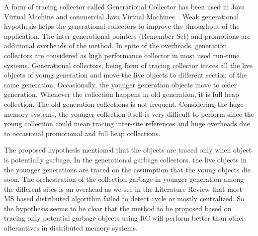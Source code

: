 A form of tracing collector called Generational Collector has been used in Java Virtual Machine and commercial Java Virtual Machines~\cite{Vengerov,Tene}. Weak generational hypothesis helps the generational collectors to improve the throughput of the application. The inter-generational pointers (Remember Set) and promotions are  additional overheads of the method. In spite of the overheads, generation collectors are considered as high performance collector in most used run-time systems. Generational collectors, being form of tracing collector traces all the live objects of young generation and move the live objects to different section of the same generation. Occasionally, the younger generation objects move to older generation. Whenever the collection happens  in old generation, it is full heap collection. The old generation collections is not frequent. Considering the huge memory systems, the younger collection itself is very difficult to perform since the young collection could mean tracing inter-site references and huge overheads due to occasional promotional and full heap collections. 

The proposed hypothesis mentioned that the objects are traced only when object is potentially garbage.  In the generational garbage collectors, the live objects in the younger generations are traced on the assumption that the young objects die soon. The orchestration of the collection garbage in younger generation among the different sites is an overhead as we see in the Literature Review that most MS based distributed algorithm failed to detect cycle or mostly centralized. So the hypothesis seems to be clear that the method to be proposed based on tracing only potential garbage objects using RC will perform better than other alternatives in distributed memory systems.
